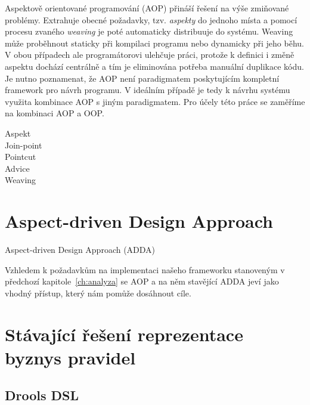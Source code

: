 Aspektově orientované programování (AOP) přináší řešení na
výše zmiňované problémy. Extrahuje obecné požadavky,
tzv. \textit{aspekty} do jednoho místa a pomocí procesu zvaného
\textit{weaving} je poté automaticky distribuuje do systému.
Weaving může proběhnout staticky při kompilaci programu nebo dynamicky
při jeho běhu.  V obou případech ale programátorovi ulehčuje práci,
protože k definici i změně aspektu dochází centrálně a tím je eliminována
potřeba manuální duplikace kódu. Je nutno poznamenat, že AOP není
paradigmatem poskytujícím kompletní framework pro návrh programu.
V ideálním případě je tedy k návrhu systému využita kombinace
AOP s jiným paradigmatem. Pro účely této práce se zaměříme na
kombinaci AOP a OOP.


\begin{description}
    \item [Aspekt]
    \item [Join-point]
    \item [Pointcut]
    \item [Advice]
    \item [Weaving]
\end{description}


\section{Aspect-driven Design Approach}

Aspect-driven Design Approach (ADDA)

Vzhledem k požadavkům na implementaci našeho frameworku stanoveným
v předchozí kapitole~\ref{ch:analyza} se AOP a na něm stavějící ADDA
jeví jako vhodný přístup, který nám pomůže dosáhnout cíle.

\section{Stávající řešení reprezentace byznys pravidel}

\subsection{Drools DSL}
